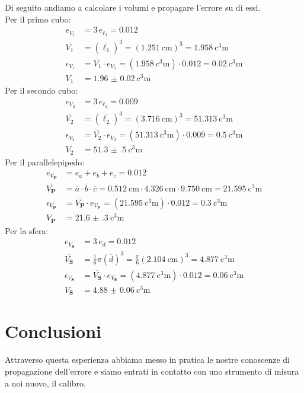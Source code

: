 \documentclass[12pt]{scrartcl}
\begin{document}
Di seguito andiamo a calcolare i volumi e propagare l'errore su di essi.\\[1em]
%
Per il primo cubo:
\begin{align*}
  e_{V_1} &= 3 \, e_{\ell_1} = \num{0.012} \\
  \overline{V_1} &= \left( \overline{\ell_1} \right)^3 = \left( \SI{1.251}{\centi\metre} \right)^3 = \SI{1.958}{\cubic\centi\metre} \\
  \epsilon_{V_1} &= \overline{V_1} \cdot e_{V_1} = \left(\SI{1.958}{\cubic\centi\metre}\right) \cdot \num{0.012} = \SI{0.02}{\cubic\centi\metre} \\
  V_1 &= \SI{1.96(2)}{\cubic\centi\metre}
\end{align*}
%
Per il secondo cubo:
\begin{align*}
  e_{V_2} &= 3 \, e_{\ell_2} = \num{0.009} \\
  \overline{V_2} &= \left( \overline{\ell_2} \right)^3 = \left( \SI{3.716}{\centi\metre} \right)^3 = \SI{51.313}{\cubic\centi\metre} \\
  \epsilon_{V_2} &= \overline{V_2} \cdot e_{V_2} = \left(\SI{51.313}{\cubic\centi\metre}\right) \cdot \num{0.009} = \SI{0.5}{\cubic\centi\metre} \\
  V_2 &= \SI{51.3(5)}{\cubic\centi\metre}
\end{align*}
%
Per il parallelepipedo:
\begin{align*}
  e_{V_\textbf{P}} &= e_{a} + e_{b} + e_{c} = \num{0.012} \\
  \overline{V_\textbf{P}} &= \overline{a} \cdot \overline{b} \cdot \overline{c} = \SI{0.512}{\centi\metre} \cdot \SI{4.326}{\centi\metre} \cdot \SI{9.750}{\centi\metre} = \SI{21.595}{\cubic\centi\metre} \\
  \epsilon_{V_\textbf{P}} &= \overline{V_\textbf{P}} \cdot e_{V_\textbf{P}} = \left(\SI{21.595}{\cubic\centi\metre}\right) \cdot \num{0.012} = \SI{0.3}{\cubic\centi\metre} \\
  V_\textbf{P} &= \SI{21.6(3)}{\cubic\centi\metre}
\end{align*}
%
Per la sfera:
\begin{align*}
  e_{V_\textbf{S}} &= 3 \, e_{d} = \num{0.012} \\
  \overline{V_\textbf{S}} &= \frac{1}{6} \pi \left(\overline{d}\right)^3 = \frac{\pi}{6} \left( \SI{2.104}{\centi\metre} \right)^3 = \SI{4.877}{\cubic\centi\metre} \\
  \epsilon_{V_\textbf{S}} &= \overline{V_\textbf{S}} \cdot e_{V_\textbf{S}} = \left(\SI{4.877}{\cubic\centi\metre}\right) \cdot \num{0.012} = \SI{0.06}{\cubic\centi\metre} \\
  V_\textbf{S} &= \SI{4.88(6)}{\cubic\centi\metre}
\end{align*}

\section{Conclusioni}

Attraverso questa esperienza abbiamo messo in pratica le nostre conoscenze di
propagazione dell'errore e siamo entrati in contatto con uno strumento di misura
a noi nuovo, il calibro.
\end{document}
